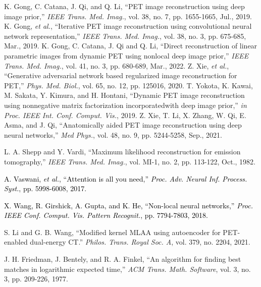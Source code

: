 \documentclass[]{IEEETran}
\newcommand{\txtb}[1]{\textcolor{black}{#1}}
\begin{document}
\begin{thebibliography}{00}
		 K. Gong, C. Catana, J. Qi, and Q. Li, ``PET image reconstruction using deep image prior,'' \emph{IEEE Trans. Med. Imag.}, vol. 38, no. 7, pp. 1655-1665, Jul., 2019.
		 K. Gong, \emph{et al.}, ``Iterative PET image reconstruction using convolutional neural network representation,'' \emph{IEEE Trans. Med. Imag.}, vol. 38, no. 3, pp. 675-685, Mar., 2019.
		 K. Gong, C. Catana, J. Qi and Q. Li, ``Direct reconstruction of linear parametric images from dynamic PET using nonlocal deep image prior,'' \emph{IEEE Trans. Med. Imag.}, vol. 41, no. 3, pp. 680-689, Mar., 2022.
		 Z. Xie, \emph{et al.}, ``Generative adversarial network based regularized image reconstruction for PET,'' \emph{Phys. Med. Biol.}, vol. 65, no. 12, pp. 125016, 2020.
		 T. Yokota, K. Kawai, M. Sakata, Y. Kimura, and H. Hontani, ``Dynamic PET image reconstruction using nonnegative matrix factorization incorporatedwith
		deep image prior,'' \emph{in Proc. IEEE Int. Conf. Comput. Vis.}, 2019.
		 Z. Xie, T. Li, X. Zhang, W. Qi, E. Asma, and J. Qi, ``Anatomically aided PET image reconstruction using deep neural networks,'' \emph{Med Phys.}, vol. 48, no. 9, pp. 5244-5258, Sep., 2021.
		
		 L. A. Shepp and Y. Vardi, ``Maximum likelihood reconstruction for emission tomography,'' \emph{IEEE Trans. Med. Imag.}, vol. MI-1, no. 2, pp.
		113-122, Oct., 1982.
		
		 \txtb{A. Vaswani, \emph{et al.}, ``Attention is all you need,'' \emph{Proc. Adv. Neural Inf. Process. Syst.}, pp. 5998-6008, 2017.}
		
		 \txtb{X. Wang, R. Girshick, A. Gupta, and K. He, ``Non-local neural networks,'' \emph{Proc. IEEE Conf. Comput. Vis. Pattern Recognit.}, pp. 7794-7803, 2018.}
		
		 S. Li and G. B. Wang, ``Modified kernel MLAA using autoencoder for PET-enabled dual-energy CT.'' \emph{Philos. Trans. Royal Soc. A}, vol. 379, no. 2204, 2021.
		
		 J. H. Friedman, J. Bentely, and R. A. Finkel, ``An algorithm for finding best matches in logarithmic expected time,'' \emph{ACM Trans. Math. Software}, vol. 3, no. 3, pp. 209-226, 1977.
		

\end{thebibliography}
\end{document}
